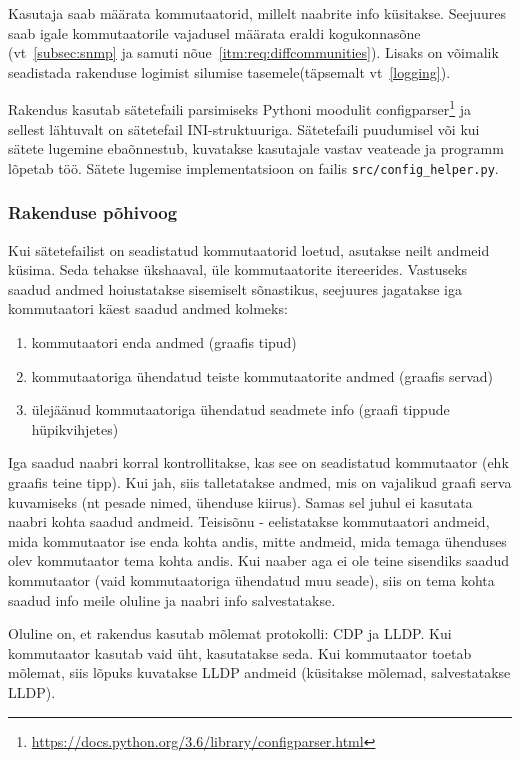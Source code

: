 \documentclass[12pt]{article}
\begin{document}
Kasutaja saab määrata kommutaatorid, millelt naabrite info küsitakse.
Seejuures saab igale kommutaatorile vajadusel määrata eraldi kogukonnasõne (vt~\ref{subsec:snmp}
ja samuti nõue~\ref{itm:req:diffcommunities}).
Lisaks on võimalik seadistada rakenduse logimist silumise tasemele(täpsemalt vt~\ref{logging}).

Rakendus kasutab sätetefaili parsimiseks Pythoni moodulit
configparser\footnote{\url{https://docs.python.org/3.6/library/configparser.html}} ja sellest
lähtuvalt on sätetefail INI-struktuuriga.
Sätetefaili puudumisel või kui sätete lugemine ebaõnnestub, kuvatakse kasutajale vastav veateade
ja programm lõpetab töö.
Sätete lugemise implementatsioon on failis \texttt{src/config\_helper.py}.

\subsubsection{Rakenduse põhivoog}

Kui sätetefailist on seadistatud kommutaatorid loetud, asutakse neilt andmeid küsima.
Seda tehakse ükshaaval, üle kommutaatorite itereerides.
Vastuseks saadud andmed hoiustatakse sisemiselt sõnastikus, seejuures jagatakse iga
kommutaatori käest saadud andmed kolmeks:
\begin{enumerate}
    \item kommutaatori enda andmed (graafis tipud)
    \item kommutaatoriga ühendatud teiste kommutaatorite andmed (graafis servad)
    \item ülejäänud kommutaatoriga ühendatud seadmete info (graafi tippude hüpikvihjetes)
\end{enumerate}
Iga saadud naabri korral kontrollitakse, kas see on seadistatud kommutaator (ehk graafis teine
tipp).
Kui jah, siis talletatakse andmed, mis on vajalikud graafi serva kuvamiseks (nt pesade nimed,
ühenduse kiirus).
Samas sel juhul ei kasutata naabri kohta saadud andmeid.
Teisisõnu - eelistatakse kommutaatori andmeid, mida kommutaator ise enda kohta andis,
mitte andmeid, mida temaga ühenduses olev kommutaator tema kohta andis.
Kui naaber aga ei ole teine sisendiks saadud kommutaator (vaid kommutaatoriga ühendatud muu seade),
siis on tema kohta saadud info meile oluline ja naabri info salvestatakse.

Oluline on, et rakendus kasutab mõlemat protokolli: CDP ja LLDP\@.
Kui kommutaator kasutab vaid üht, kasutatakse seda.
Kui kommutaator toetab mõlemat, siis lõpuks kuvatakse LLDP andmeid (küsitakse mõlemad,
salvestatakse LLDP).
\end{document}
